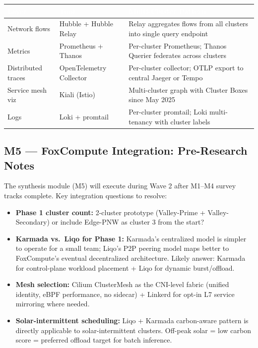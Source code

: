 \documentclass[11pt,letterpaper]{article}
\newcommand{\tableheader}[1]{\textbf{\sffamily\textcolor{white}{#1}}}
\begin{document}
\begin{center}
\begin{tabularx}{\textwidth}{L{3.5cm}L{3cm}X}
\toprule
{}
\tableheader{Layer} & \tableheader{Tool} & \tableheader{Multi-Cluster Pattern} \\
\midrule
Network flows & Hubble + Hubble Relay & Relay aggregates flows from all clusters into single query endpoint \\
Metrics & Prometheus + Thanos & Per-cluster Prometheus; Thanos Querier federates across clusters \\
Distributed traces & OpenTelemetry Collector & Per-cluster collector; OTLP export to central Jaeger or Tempo \\
Service mesh viz & Kiali (Istio) & Multi-cluster graph with Cluster Boxes since May 2025 \\
Logs & Loki + promtail & Per-cluster promtail; Loki multi-tenancy with cluster labels \\
\bottomrule
\end{tabularx}
\end{center}

\subsection{M5 --- FoxCompute Integration: Pre-Research Notes}

The synthesis module (M5) will execute during Wave 2 after M1--M4 survey tracks complete. Key integration questions to resolve:

\begin{itemize}[leftmargin=1.5em]
  \item \textbf{Phase 1 cluster count:} 2-cluster prototype (Valley-Prime + Valley-Secondary) or include Edge-PNW as cluster 3 from the start?
  \item \textbf{Karmada vs.\ Liqo for Phase 1:} Karmada's centralized model is simpler to operate for a small team; Liqo's P2P peering model maps better to FoxCompute's eventual decentralized architecture. Likely answer: Karmada for control-plane workload placement + Liqo for dynamic burst/offload.
  \item \textbf{Mesh selection:} Cilium ClusterMesh as the CNI-level fabric (unified identity, eBPF performance, no sidecar) + Linkerd for opt-in L7 service mirroring where needed.
  \item \textbf{Solar-intermittent scheduling:} Liqo + Karmada carbon-aware pattern is directly applicable to solar-intermittent clusters. Off-peak solar = low carbon score = preferred offload target for batch inference.
\end{itemize}
\end{document}
